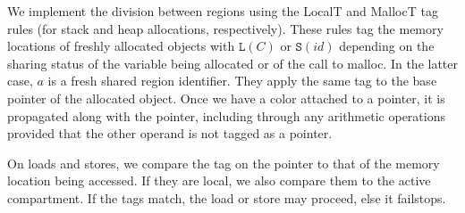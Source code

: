 \documentclass{article}
\begin{document}
We implement the division between regions using the LocalT and MallocT tag rules
(for stack and heap allocations, respectively). These rules tag the memory locations
of freshly allocated objects with \(\mathtt{L}(C)\) or \(\mathtt{S}(id)\) depending
on the sharing status of the variable being allocated or of the call to malloc.
In the latter case, \(a\) is a fresh shared region identifier.
They apply the same tag to the base pointer of the allocated object.
Once we have a color attached to a pointer, it is propagated along
with the pointer, including through any arithmetic operations provided that the other operand
is not tagged as a pointer.

On loads and stores, we compare the tag on the pointer to that of the memory location
being accessed. If they are local, we also compare them to the active compartment.
If the tags match, the load or store may proceed, else it failstops.
\end{document}
